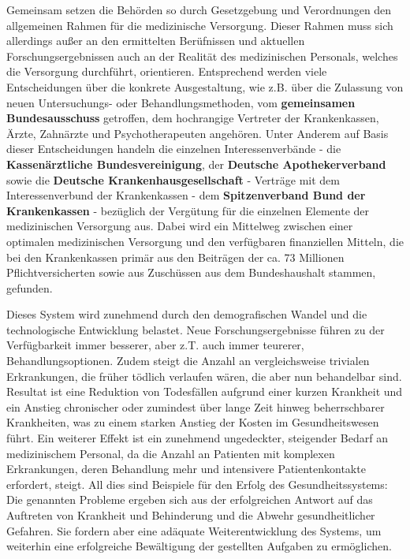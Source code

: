 Gemeinsam setzen die Behörden so durch Gesetzgebung und Verordnungen den allgemeinen Rahmen für die medizinische Versorgung. Dieser Rahmen muss sich allerdings außer an den ermittelten Berüfnissen und aktuellen Forschungsergebnissen auch an der Realität des medizinischen Personals, welches die Versorgung durchführt, orientieren. Entsprechend werden viele Entscheidungen über die konkrete Ausgestaltung, wie z.B. über die Zulassung von neuen Untersuchungs- oder Behandlungsmethoden, vom \textbf{gemeinsamen Bundesausschuss} getroffen, dem hochrangige Vertreter der Krankenkassen, Ärzte, Zahnärzte und Psychotherapeuten angehören. Unter Anderem auf Basis dieser Entscheidungen handeln die einzelnen Interessenverbände - die \textbf{Kassenärztliche Bundesvereinigung}, der \textbf{Deutsche Apothekerverband} sowie die \textbf{Deutsche Krankenhausgesellschaft} - Verträge mit dem Interessenverbund der Krankenkassen - dem \textbf{Spitzenverband Bund der Krankenkassen} - bezüglich der Vergütung für die einzelnen Elemente der medizinischen Versorgung aus. Dabei wird ein Mittelweg zwischen einer optimalen medizinischen Versorgung und den verfügbaren finanziellen Mitteln, die bei den Krankenkassen primär aus den Beiträgen der ca. 73 Millionen Pflichtversicherten sowie aus Zuschüssen aus dem Bundeshaushalt stammen, gefunden. 

Dieses System wird zunehmend durch den demografischen Wandel und die technologische Entwicklung belastet. Neue Forschungsergebnisse führen zu der Verfügbarkeit immer besserer, aber z.T. auch immer teurerer, Behandlungsoptionen. Zudem steigt die Anzahl an vergleichsweise trivialen Erkrankungen, die früher tödlich verlaufen wären, die aber nun behandelbar sind. Resultat ist eine Reduktion von Todesfällen aufgrund einer kurzen Krankheit und ein Anstieg chronischer oder zumindest über lange Zeit hinweg beherrschbarer Krankheiten, was zu einem starken Anstieg der Kosten im Gesundheitswesen führt. Ein weiterer Effekt ist ein zunehmend ungedeckter, steigender Bedarf an medizinischem Personal, da die Anzahl an Patienten mit komplexen Erkrankungen, deren Behandlung mehr und intensivere Patientenkontakte erfordert, steigt. All dies sind Beispiele für den Erfolg des Gesundheitssystems: Die genannten Probleme ergeben sich aus der erfolgreichen Antwort auf das Auftreten von Krankheit und Behinderung und die Abwehr gesundheitlicher Gefahren. Sie fordern aber eine adäquate Weiterentwicklung des Systems, um weiterhin eine erfolgreiche Bewältigung der gestellten Aufgaben zu ermöglichen.

